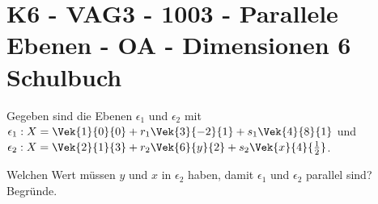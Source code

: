 \section{K6 - VAG3 - 1003 - Parallele Ebenen - OA - Dimensionen 6 Schulbuch}

\begin{beispiel}[K6 - VAG3]{1}
Gegeben sind die Ebenen $\epsilon_1$ und $\epsilon_2$ mit $\epsilon_1:X=\Vek{1
}{0}{0}+r_1\Vek{3}{-2}{1}+s_1\Vek{4}{8}{1}$ und $\epsilon_2:X=\Vek{2}{1}{3}+r_
2\Vek{6}{y}{2}+s_2\Vek{x}{4}{\frac{1}{2}}$.

Welchen Wert müssen $y$ und $x$ in $\epsilon_2$ haben, damit $\epsilon_1$ und $\epsilon_2$ parallel sind? Begründe.\leer

\end{beispiel}